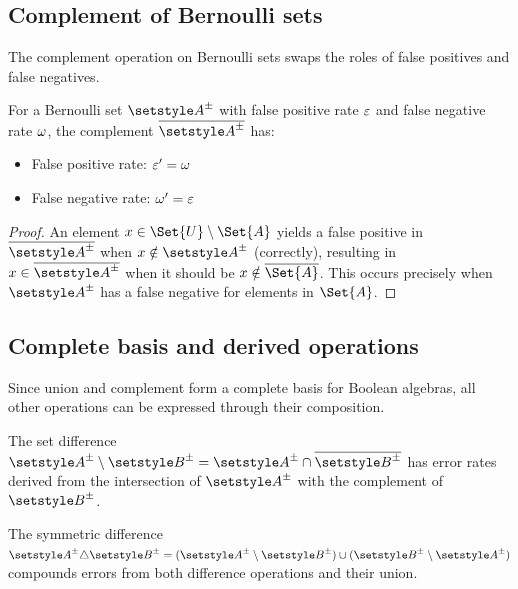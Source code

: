 \documentclass[ ../main.tex]{subfiles}
\begin{document}
\subsection{Complement of Bernoulli sets}

The complement operation on Bernoulli sets swaps the roles of false positives and false negatives.

\begin{theorem}
\label{thm:complement_error}
For a Bernoulli set $\ASet{A}$ with false positive rate $\varepsilon$ and false negative rate $\omega$, the complement $\overline{\ASet{A}}$ has:
\begin{itemize}
\item False positive rate: $\varepsilon' = \omega$
\item False negative rate: $\omega' = \varepsilon$
\end{itemize}
\end{theorem}

\begin{proof}
An element $x \in \Set{U} \setminus \Set{A}$ yields a false positive in $\overline{\ASet{A}}$ when $x \notin \ASet{A}$ (correctly), resulting in $x \in \overline{\ASet{A}}$ when it should be $x \notin \overline{\Set{A}}$. This occurs precisely when $\ASet{A}$ has a false negative for elements in $\Set{A}$.
\end{proof}

\subsection{Complete basis and derived operations}

Since union and complement form a complete basis for Boolean algebras, all other operations can be expressed through their composition.

\begin{corollary}
The set difference $\ASet{A} \setminus \ASet{B} = \ASet{A} \cap \overline{\ASet{B}}$ has error rates derived from the intersection of $\ASet{A}$ with the complement of $\ASet{B}$.
\end{corollary}

\begin{corollary}
The symmetric difference $\ASet{A} \triangle \ASet{B} = (\ASet{A} \setminus \ASet{B}) \cup (\ASet{B} \setminus \ASet{A})$ compounds errors from both difference operations and their union.
\end{corollary}
\end{document}
